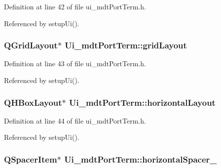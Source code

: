 Definition at line 42 of file ui\-\_\-mdt\-Port\-Term.\-h.



Referenced by setup\-Ui().

\hypertarget{class_ui__mdt_port_term_a4bb113c1e6994b9d0e0346a7a7525b9a}{
\subsubsection[{grid\-Layout}]{\setlength{\rightskip}{0pt plus 5cm}Q\-Grid\-Layout$\ast$ Ui\-\_\-mdt\-Port\-Term\-::grid\-Layout}}\label{class_ui__mdt_port_term_a4bb113c1e6994b9d0e0346a7a7525b9a}


Definition at line 43 of file ui\-\_\-mdt\-Port\-Term.\-h.



Referenced by setup\-Ui().

\hypertarget{class_ui__mdt_port_term_a550d695251cf000d6de78344601809a2}{
\subsubsection[{horizontal\-Layout}]{\setlength{\rightskip}{0pt plus 5cm}Q\-H\-Box\-Layout$\ast$ Ui\-\_\-mdt\-Port\-Term\-::horizontal\-Layout}}\label{class_ui__mdt_port_term_a550d695251cf000d6de78344601809a2}


Definition at line 44 of file ui\-\_\-mdt\-Port\-Term.\-h.



Referenced by setup\-Ui().

\hypertarget{class_ui__mdt_port_term_a3187cf956072cfa3c15fb7d5d0bd93ad}{
\subsubsection[{horizontal\-Spacer\-\_\-2}]{\setlength{\rightskip}{0pt plus 5cm}Q\-Spacer\-Item$\ast$ Ui\-\_\-mdt\-Port\-Term\-::horizontal\-Spacer\-\_}}\label{class_ui__mdt_port_term_a3187cf956072cfa3c15fb7d5d0bd93ad}


